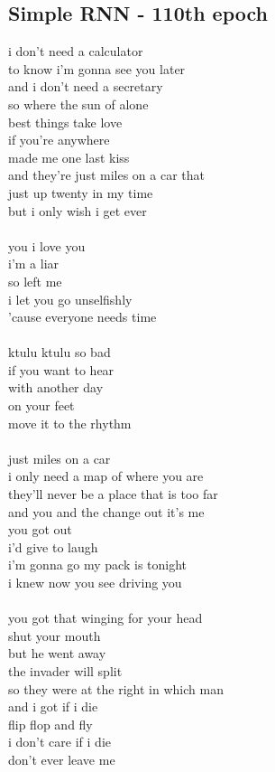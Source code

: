 \documentclass[conference]{IEEEtran}
\begin{document}
\subsection{Simple RNN - 110th epoch}\label{RNN110}
i don't need a calculator \\
to know i'm gonna see you later \\
and i don't need a secretary \\
so where the sun of alone \\
best things take love \\
if you're anywhere \\
made me one last kiss \\
and they're just miles on a car that \\
just up twenty in my time \\
but i only wish i get ever \\
\\
you i love you \\
i'm a liar \\
so left me \\
i let you go unselfishly \\
'cause everyone needs time \\
\\
ktulu ktulu so bad \\
if you want to hear \\
with another day \\
on your feet \\
move it to the rhythm \\
\\
just miles on a car \\
i only need a map of where you are \\
they'll never be a place that is too far \\
and you and the change out it's me \\
you got out \\
i'd give to laugh \\
i'm gonna go my pack is tonight \\
i knew now you see driving you \\
\\
you got that winging for your head \\
shut your mouth \\
but he went away \\
the invader will split \\
so they were at the right in which man \\
and i got if i die \\
flip flop and fly \\
i don't care if i die \\
don't ever leave me \\
\end{document}

